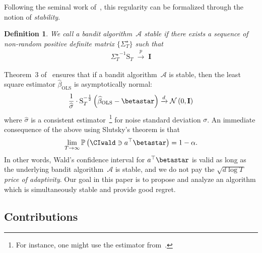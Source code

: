 \documentclass[11pt,letterpaper]{article}
\newcommand{\Prob}{\mathbb{P}}
\newcommand{\betaols}{\widehat{\beta}_{\mathrm{OLS}}}
\newcommand{\ST}{\ensuremath{\mathrm{S}_T}}
\newcommand{\inprob}{\; \stackrel{p}{\rightarrow} \; }
\newcommand{\BT}{{\Sigma^\star_T}}
\newcommand{\Id}{\mathbf{I}}
\newcommand{\Ncal}{\mathcal{N}}
\newcommand{\algo}{\mathcal{A}}
\theoremstyle{plain}
\newtheorem{definition}{Definition}
\theoremstyle{definition}  %
\begin{document}
Following the seminal work of~\cite{lai1982least}, this regularity can be formalized
through the notion of \emph{stability}. 



%
%
\begin{definition}
\label{defn:stability}
    We call a bandit algorithm~$\algo$ stable if there exists a sequence of \emph{non-random positive definite} matrix $\{\BT\}$ such that 
    \begin{align}
        \BT^{-1} \ST \inprob \Id 
    \end{align}
\end{definition}
Theorem~3 of~\cite{lai1982least} ensures that if a bandit algorithm~$\algo$ is stable, then the least square estimator $\betaols$ is asymptotically normal: 
\begin{align}
    \label{eqn:ols-normality}
    \frac{1}{\widehat{\sigma}} \cdot \ST^{-\frac{1}{2}} \left( \betaols - \betastar \right) \xrightarrow{d} \Ncal \left( 0, \Id \right)
\end{align}
where $\widehat{\sigma}$ is a consistent estimator~\footnote{For instance, one might use the estimator from~\cite[Lemma 3]{lai1982least}.} for noise standard deviation $\sigma$. An immediate consequence of the above using Slutsky's theorem is that 
%
\begin{align*}
    \lim_{T \rightarrow \infty} \Prob \left( \CIwald \ni a^\top \betastar \right) = 1 - \alpha. 
\end{align*}
%
In other words, Wald's confidence interval for $a^\top \betastar$ is valid as long as the underlying bandit algorithm~$\algo$ is stable, and we do not pay the $\sqrt{d\log T}$ \emph{price of adaptivity}. Our goal in this paper is to propose and analyze an algorithm which is simultaneously stable and provide good regret.  
%

\subsection{Contributions}
\label{sec:Contrib}
\end{document}

